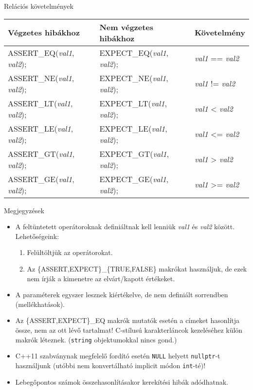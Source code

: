 \documentclass[usenames,dvipsnames,aspectratio=169]{beamer}
\begin{document}
\begin{frame}
  \begin{center}
    Relációs követelmények
    \medskip\\
    \begin{tabular}{lll}
      \textbf{Végzetes hibákhoz} & \textbf{Nem végzetes hibákhoz} & \textbf{Követelmény}\\ \hline
      ASSERT\_EQ(\emph{val1}, \emph{val2}); & EXPECT\_EQ(\emph{val1}, \emph{val2}); & \emph{val1} == \emph{val2}\\
      ASSERT\_NE(\emph{val1}, \emph{val2}); & EXPECT\_NE(\emph{val1}, \emph{val2}); & \emph{val1} != \emph{val2}\\
      ASSERT\_LT(\emph{val1}, \emph{val2}); & EXPECT\_LT(\emph{val1}, \emph{val2}); & \emph{val1} < \emph{val2}\\
      ASSERT\_LE(\emph{val1}, \emph{val2}); & EXPECT\_LE(\emph{val1}, \emph{val2}); & \emph{val1} <= \emph{val2}\\
      ASSERT\_GT(\emph{val1}, \emph{val2}); & EXPECT\_GT(\emph{val1}, \emph{val2}); & \emph{val1} > \emph{val2}\\
      ASSERT\_GE(\emph{val1}, \emph{val2}); & EXPECT\_GE(\emph{val1}, \emph{val2}); & \emph{val1} >= \emph{val2}
    \end{tabular}
  \end{center}
\end{frame}

\begin{frame}
  Megjegyzések
  \begin{itemize}
    \item A feltüntetett operátoroknak definiáltnak kell lenniük \emph{val1} és \emph{val2} között. Lehetőségeink:
    \begin{enumerate}
      \item Felültöltjük az operátorokat.
      \item Az \{ASSERT,EXPECT\}\_\{TRUE,FALSE\} makrókat használjuk, de ezek nem írják a kimenetre az elvárt/kapott 
értékeket.
    \end{enumerate}
    \item A paraméterek egyszer lesznek kiértékelve, de nem definiált sorrendben (mellékhatások).
    \item Az \{ASSERT,EXPECT\}\_EQ makrók mutatók esetén a címeket hasonlítja össze, nem az ott lévő tartalmat! C-stílusú 
karakterláncok kezeléséhez külön makrók léteznek. (\texttt{string} objektumokkal nincs gond.)
    \item C++11 szabványnak megfelelő fordító esetén \texttt{NULL} helyett \texttt{nullptr}-t használjunk 
(utóbbi nem konvertálható implicit módon \texttt{int}-té)!
    \item Lebegőpontos számok összehasonlításakor kerekítési hibák adódhatnak.
  \end{itemize}
\end{frame}
\end{document}
